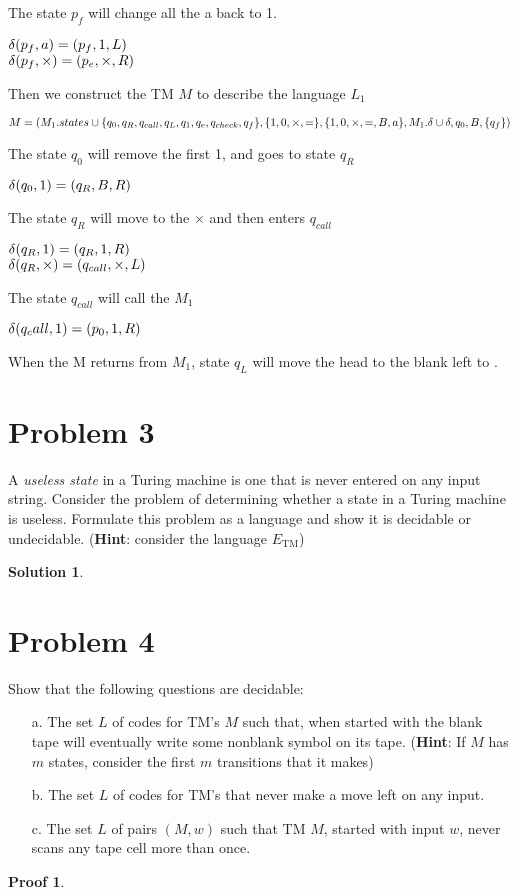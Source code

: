\documentclass[a4paper,UTF8]{ctexart}
\theoremstyle{definition}
\newtheorem*{solution}{Solution}
\newtheorem*{prove}{Proof}
\begin{document}
The state $p_f$ will change all the a back to 1.

$\delta(p_f,a)=(p_f,1,L)$\\
$\delta(p_f,\times)=(p_e,\times,R)$

Then we construct the TM $M$ to describe the language $L_1$

\[M = (
  M_1.states \cup \{ q_0,q_R,q_{call},q_L,q_1,q_e,q_{check},q_f \},
  \{ 1,0,\times,= \},
  \{ 1,0,\times,=,B,a \},
  M_1.\delta \cup \delta,
  q_0,B,\{ q_f \} )\]

The state $q_0$ will remove the first 1, and goes to state $q_R$

$\delta(q_0,1)=(q_R,B,R) $

The state $q_R$ will move to the $\times$ and then enters $q_{call}$

$\delta(q_R,1)=(q_R,1,R)$\\
$\delta(q_R,\times)=(q_{call},\times,L)$

The state $q_{call}$ will call the $M_1$

$\delta(q_call,1)=(p_0,1,R)$

When the M returns from $M_1$, state $q_L$ will move the head
to the blank left to .

\section*{Problem 3}
A \textit{useless state} in a Turing machine is one that is never entered on any input string. Consider the problem of determining whether a state in a Turing machine is useless. Formulate this problem as a language and show it is decidable or undecidable. (\textbf{Hint}: consider the language $E_{\mathrm{TM}}$)
\begin{solution}
\end{solution}
\newpage

\section*{Problem 4}
Show that the following questions are decidable:
\begin{enumerate}
  \item[a.] The set $L$ of codes for TM’s $M$ such that, when started with the blank tape will eventually write some nonblank symbol on its tape. (\textbf{Hint}: If $M$ has $m$ states, consider the first $m$ transitions that it makes)
  \item[b.] The set $L$ of codes for TM’s that never make a move left on any input.
  \item[c.] The set $L$ of pairs $(M,w)$ such that TM $M$, started with input $w$, never scans any tape cell more than once.
\end{enumerate}
\begin{prove}
\end{prove}
\newpage
\end{document}
